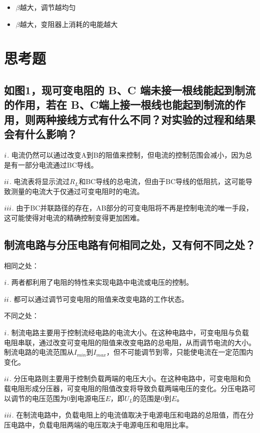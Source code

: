 \documentclass{article}
\begin{document}
\begin{itemize}
    \item $\beta$越大，调节越均匀
    \item $\beta$越大，变阻器上消耗的电能越大
\end{itemize}

\section{思考题}
\subsection{如图1，现可变电阻的 B、C 端未接一根线能起到制流的作用，若在 B、C端上接一根线也能起到制流的作用，则两种接线方式有什么不同？对实验的过程和结果会有什么影响？}

$\romannumeral1$. 电流仍然可以通过改变A到B的阻值来控制，但电流的控制范围会减小，因为总是有一部分电流通过BC导线。

$\romannumeral2$. 电流表将显示流过$R_L$和BC导线的总电流，但由于BC导线的低阻抗，这可能导致测量的电流大于仅通过可变电阻时的电流。

$\romannumeral3$. 由于BC并联路径的存在，AB部分的可变电阻将不再是控制电流的唯一手段，这可能使得对电流的精确控制变得更加困难。

\subsection{制流电路与分压电路有何相同之处，又有何不同之处？}

相同之处：

$\romannumeral1$. 两者都利用了电阻的特性来实现电路中电流或电压的控制。

$\romannumeral2$. 都可以通过调节可变电阻的阻值来改变电路的工作状态。

不同之处：

$\romannumeral1$. 制流电路主要用于控制流经电路的电流大小。在这种电路中，可变电阻与负载电阻串联，通过改变可变电阻的阻值来改变电路的总电阻，从而调节电流的大小。制流电路的电流范围从$I_{min}$到$I_{max}$，但不可能调节到零，只能使电流在一定范围内变化。

$\romannumeral2$. 分压电路则主要用于控制负载两端的电压大小。在这种电路中，可变电阻和负载电阻形成分压器，可变电阻的阻值改变将导致负载两端电压的变化。分压电路可以调节的电压范围为0到电源电压$E$，即$U_L$的范围是0到$E$。 

$\romannumeral3$. 在制流电路中，负载电阻上的电流值取决于电源电压和电路的总阻值，而在分压电路中，负载电阻两端的电压取决于电源电压和电阻比率。
\end{document}
